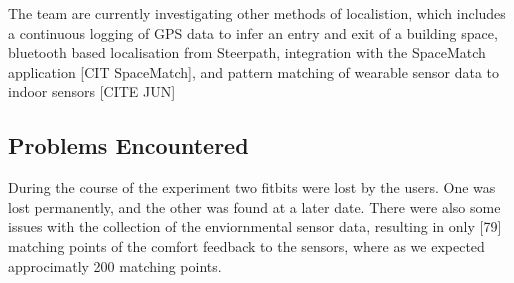 The team are currently investigating other methods of localistion, which includes a continuous logging of GPS data to infer an entry and exit of a building space, bluetooth based localisation from Steerpath, integration with the SpaceMatch application [CIT SpaceMatch], and pattern matching of wearable sensor data to indoor sensors [CITE JUN]


\subsection{Problems Encountered}

During the course of the experiment two fitbits were lost by the users. One was lost permanently, and the other was found at a later date. There were also some issues with the collection of the enviornmental sensor data, resulting in only [79] matching points of the comfort feedback to the sensors, where as we expected approcimatly 200 matching points.





